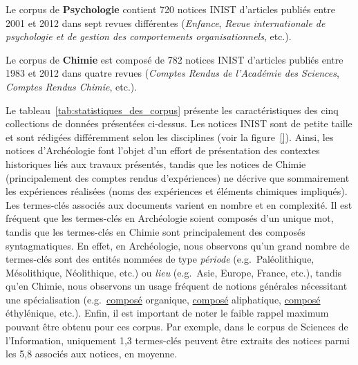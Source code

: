   Le corpus de \textbf{Psychologie} contient 720 notices INIST d'articles
  publiés entre 2001 et 2012 dans sept revues différentes
  (\textit{Enfance}, \textit{Revue internationale de psychologie et de gestion
  des comportements organisationnels}, etc.).

  Le corpus de \textbf{Chimie} est composé de 782 notices INIST d'articles
  publiés entre 1983 et 2012 dans quatre revues (\textit{Comptes Rendus de
  l'Académie des Sciences}, \textit{Comptes Rendus Chimie}, etc.).

  Le tableau~\ref{tab:statistiques_des_corpus} présente les caractéristiques des
  cinq collections de données présentées ci-dessus.
  Les notices INIST sont de petite taille et sont rédigées différemment selon
  les disciplines (voir la figure~\ref{}). Ainsi, les notices
  d'Archéologie font l'objet d'un effort de présentation des contextes
  historiques liés aux travaux présentés, tandis que les notices de Chimie
  (principalement des comptes rendus d'expériences) ne décrive que sommairement
  les expériences réalisées (noms des expériences et éléments chimiques
  impliqués). Les termes-clés associés aux documents varient en nombre et en
  complexité. Il est fréquent que les termes-clés en Archéologie soient composés
  d'un unique mot, tandis que les termes-clés en Chimie sont principalement des
  composés syntagmatiques. En effet, en Archéologie, nous observons qu'un grand
  nombre de termes-clés sont des entités nommées de type \textit{période}
  (e.g.~\og{}Paléolithique\fg{}, \og{}Mésolithique\fg{}, \og{}Néolithique\fg{},
  etc.) ou \textit{lieu} (e.g.~\og{}Asie\fg{}, \og{}Europe\fg{},
  \og{}France\fg{}, etc.), tandis qu'en Chimie, nous observons un usage fréquent
  de notions générales nécessitant une spécialisation
  (e.g.~\og{}\underline{composé} organique\fg{}, \og{}\underline{composé}
  aliphatique\fg{}, \og{}\underline{composé} éthylénique\fg{}, etc.). Enfin, il
  est important de noter le faible rappel maximum pouvant être obtenu pour ces
  corpus. Par exemple, dans le corpus de Sciences de l'Information, uniquement
  1,3 termes-clés peuvent être extraits des notices parmi les 5,8 associés aux
  notices, en moyenne.
